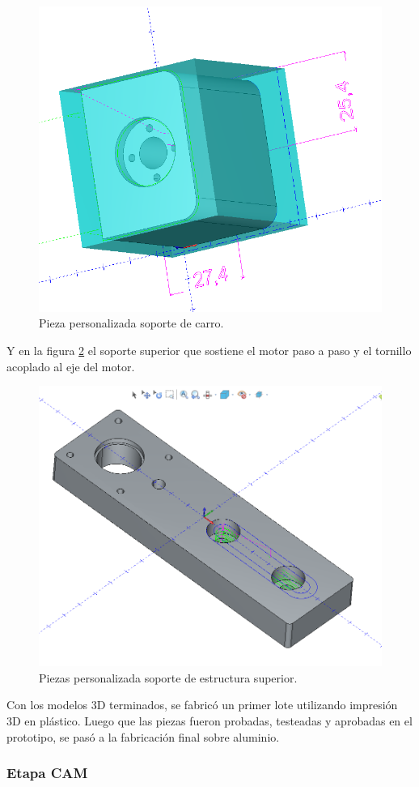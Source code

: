 \begin{figure}[ht]
	\centering
	\includegraphics[width=.6\textwidth]{./Figures/3d_carro.png}
	\caption{Pieza personalizada soporte de carro.}
	\label{fig:carro}
\end{figure}

Y en la figura \ref{fig:estructura_superior} el soporte superior que sostiene el motor paso a paso y el  tornillo acoplado al eje del motor.

\begin{figure}[h]
	\centering
	\includegraphics[width=.6\textwidth]{./Figures/3d_top.png}
	\caption{Piezas personalizada soporte de estructura superior.}
	\label{fig:estructura_superior}
\end{figure}

Con los modelos 3D terminados, se fabricó un primer lote utilizando impresión 3D en plástico.
Luego que las piezas fueron probadas, testeadas y aprobadas en el prototipo, se pasó a la fabricación final sobre aluminio.

\subsubsection{Etapa CAM}

